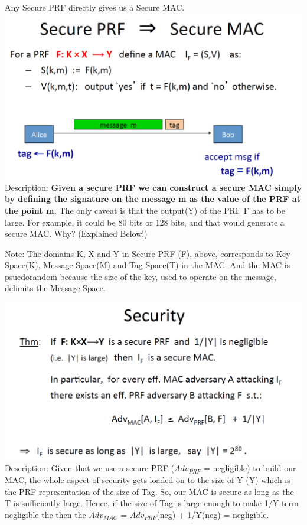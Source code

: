 \documentclass[11pt]{article}
\makeatletter
\def\maxwidth{\ifdim\Gin@nat@width>\linewidth\linewidth
    \else\Gin@nat@width\fi}
\let\Oldincludegraphics\includegraphics
\renewcommand{\includegraphics}[1]{\Oldincludegraphics[width=.8\maxwidth]{#1}}
\makeatother
\begin{document}
Any Secure PRF directly gives us a Secure MAC.
\includegraphics{./Images/S-PRFgivesS-MAC.png} Description:
\textbf{Given a secure PRF we can construct a secure MAC simply by
defining the signature on the message m as the value of the PRF at the
point m.} The only caveat is that the output(Y) of the PRF F has to be
large. For example, it could be 80 bits or 128 bits, and that would
generate a secure MAC. Why? (Explained Below!)

Note: The domains K, X and Y in Secure PRF (F), above, corresponds to
Key Space(K), Message Space(M) and Tag Space(T) in the MAC. And the MAC
is psuedorandom because the size of the key, used to operate on the
message, delimits the Message Space.

\includegraphics{./Images/SecurityThm4S-MAC.png} Description: Given that
we use a secure PRF (\(Adv_{PRF}\) = negligible) to build our MAC, the
whole aspect of security gets loaded on to the size of Y
(\textbar{}Y\textbar{}) which is the PRF representation of the size of
Tag. So, our MAC is secure as long as the \textbar{}T\textbar{} is
sufficiently large. Hence, if the size of Tag is large enough to make
1/\textbar{}Y\textbar{} term negligible the then the \(Adv_{MAC}\) =
\(Adv_{PRF}\)(neg) + 1/\textbar{}Y\textbar{}(neg) = negligible.
\end{document}
